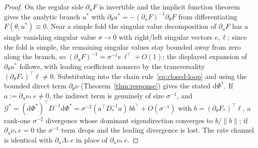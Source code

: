 \documentclass[11pt,reqno]{amsart}
\theoremstyle{plain}
\theoremstyle{definition}
\theoremstyle{remark}
\newcommand{\dd}{\mathrm{d}}
\begin{document}
\begin{proof}
On the regular side $\partial_uF$ is invertible and the implicit function
theorem~\cite[Thm.~3.3.1]{KrantzParks2013} gives the analytic branch $u^{*}$ with
$\partial_\theta u^{*}=-(\partial_uF)^{-1}\partial_\theta F$ from differentiating
$F(\theta,u^{*})\equiv0$. Near a simple fold the singular value decomposition of
$\partial_uF$ has a single vanishing singular value $\sigma\to0$ with right/left
singular vectors $e,\ell$; since the fold is simple, the remaining singular values
stay bounded away from zero along the branch, so
$(\partial_uF)^{-1}=\sigma^{-1}e\,\ell^{\top}+O(1)$;
the displayed expansion of $\partial_\theta u^{*}$ follows, with leading coefficient
nonzero by the transversality $(\partial_\theta F_*)^{\top}\ell\neq0$. Substituting
into the chain rule~\eqref{eq:closed-loop} and using the bounded direct term
$\partial_\theta\nu$ (Theorem~\ref{thm:response}) gives the stated $\dd\Phi^{*}$. If
$a:=\partial_u\nu_*\,e\neq0$, the indirect term is genuinely of size $\sigma^{-1}$,
and $\mathcal G^{*}=(\dd\Phi^{*})^{\top}D^{-1}\dd\Phi^{*}=\sigma^{-2}(a^{\top}
D_*^{-1}a)\,bb^{\top}+O(\sigma^{-1})$ with $b=(\partial_\theta F_*)^{\top}\ell$, a
rank-one $\sigma^{-2}$ divergence whose dominant eigendirection converges to
$b/\|b\|$; if $\partial_u\nu_*\,e=0$ the $\sigma^{-1}$ term drops and the leading
divergence is lost. The rate channel is identical with $\partial_u\Lambda_*\,e$ in
place of $\partial_u\nu_*\,e$.
\end{proof}
\end{document}
